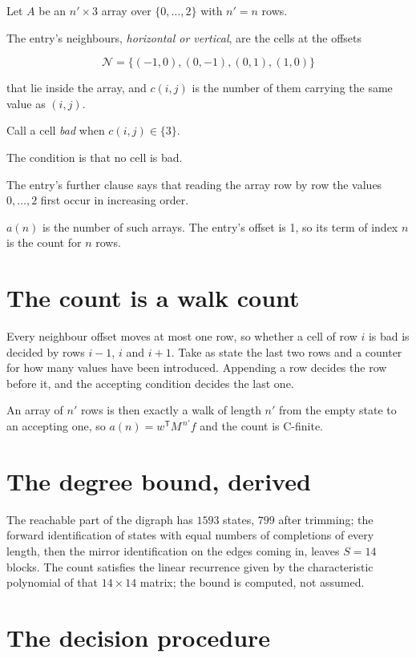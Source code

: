 \documentclass[11pt]{article}
\theoremstyle{definition}
\begin{document}
Let $A$ be an $n' \times 3$ array over $\{0,\dots,2\}$ with $n' = n$ rows.

The entry's neighbours, {\itshape horizontal or vertical}, are the cells at the offsets

\[\mathcal{N} = \{(-1,0), (0,-1), (0,1), (1,0)\}\]

that lie inside the array, and $c(i,j)$ is the number of them carrying the same value as $(i,j)$.

Call a cell {\itshape bad} when $c(i,j) \in \{3\}$.

The condition is that no cell is bad.

The entry's further clause says that reading the array row by row the values $0,\dots,2$ first occur in increasing order.

$a(n)$ is the number of such arrays. The entry's offset is 1, so its term of index $n$ is the count for $n$ rows.

\section{The count is a walk count}

Every neighbour offset moves at most one row, so whether a cell of row $i$ is bad is decided by rows $i-1$, $i$ and $i+1$. Take as state the last two rows and a counter for how many values have been introduced. Appending a row decides the row before it, and the accepting condition decides the last one.

An array of $n'$ rows is then exactly a walk of length $n'$ from the empty state to an accepting one, so $a(n) = w^{\mathsf T}M^{\,n'}f$ and the count is C-finite.

\section{The degree bound, derived}

The reachable part of the digraph has $1593$ states, $799$ after trimming; the forward identification of states with equal numbers of completions of every length, then the mirror identification on the edges coming in, leaves $S = 14$ blocks. The count satisfies the linear recurrence given by the characteristic polynomial of that $14\times14$ matrix; the bound is computed, not assumed.

\section{The decision procedure}
\end{document}
